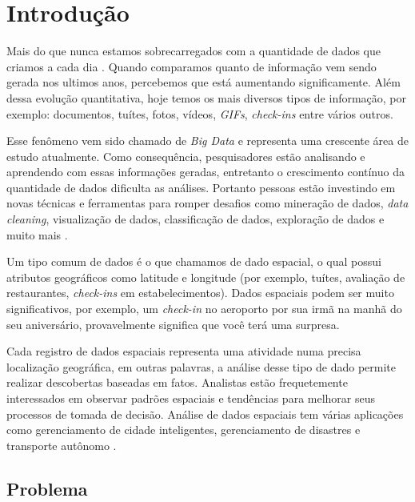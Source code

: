 \chapter{Introdução}
\label{chap:introducao}

Mais do que nunca estamos sobrecarregados com a quantidade de dados que criamos a cada dia \cite{Pradeep2017}. Quando comparamos quanto de informação vem sendo gerada nos ultimos anos, percebemos que está aumentando significamente. Além dessa evolução quantitativa, hoje temos os mais diversos tipos de informação, por exemplo: documentos, tuítes, fotos, vídeos, \textit{GIFs}, \textit{check-ins} entre vários outros.

Esse fenômeno vem sido chamado de \textit{Big Data} e representa uma crescente área de estudo atualmente. Como consequência, pesquisadores estão analisando e aprendendo com essas informações geradas, entretanto o crescimento contínuo da quantidade de dados dificulta as análises. Portanto pessoas estão investindo em novas técnicas e ferramentas para romper desafios como mineração de dados, {\em data cleaning}, visualização de dados, classificação de dados, exploração de dados e muito mais \cite{Zhang2015}.

Um tipo comum de dados é o que chamamos de dado espacial, o qual  possui atributos geográficos como latitude e longitude (por exemplo, tuítes, avaliação de restaurantes, {\em check-ins} em estabelecimentos). Dados espaciais podem ser muito significativos, por exemplo, um {\em check-in} no aeroporto por sua irmã na manhã do seu aniversário, provavelmente significa que você terá uma surpresa.

Cada registro de dados espaciais representa uma atividade numa precisa localização geográfica, em outras palavras, a análise desse tipo de dado permite realizar descobertas baseadas em fatos. Analistas estão frequetemente interessados em observar padrões espaciais e tendências para melhorar seus processos de tomada de decisão. Análise de dados espaciais tem várias aplicações como gerenciamento de cidade inteligentes, gerenciamento de disastres e transporte autônomo \cite{RoddickEHPS04,Telang:2012}.

\section{Problema}

